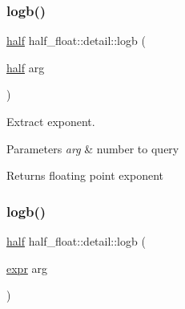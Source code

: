 \mbox{\label{namespacehalf__float_1_1detail_a9963a6cdd7b45287f35438e07717eba2}} 
\subsubsection{\texorpdfstring{logb()}{logb()}\hspace{0.1cm}{\footnotesize\ttfamily [1/2]}}
{\footnotesize\ttfamily \hyperlink{classhalf__float_1_1half}{half} half\+\_\+float\+::detail\+::logb (\begin{DoxyParamCaption}\item[{\hyperlink{classhalf__float_1_1half}{half}}]{arg }\end{DoxyParamCaption})\hspace{0.3cm}{\ttfamily [inline]}}

Extract exponent. 
\begin{DoxyParams}{Parameters}
{\em arg} & number to query \\
\hline
\end{DoxyParams}
\begin{DoxyReturn}{Returns}
floating point exponent 
\end{DoxyReturn}
\mbox{\label{namespacehalf__float_1_1detail_a37ddd9d452d9bd4c6d31f56adf9f6620}} 
\subsubsection{\texorpdfstring{logb()}{logb()}\hspace{0.1cm}{\footnotesize\ttfamily [2/2]}}
{\footnotesize\ttfamily \hyperlink{classhalf__float_1_1half}{half} half\+\_\+float\+::detail\+::logb (\begin{DoxyParamCaption}\item[{\hyperlink{structhalf__float_1_1detail_1_1expr}{expr}}]{arg }\end{DoxyParamCaption})\hspace{0.3cm}{\ttfamily [inline]}}

\mbox{\label{namespacehalf__float_1_1detail_aa2ee848c78f938434f485e75904bee45}} 
